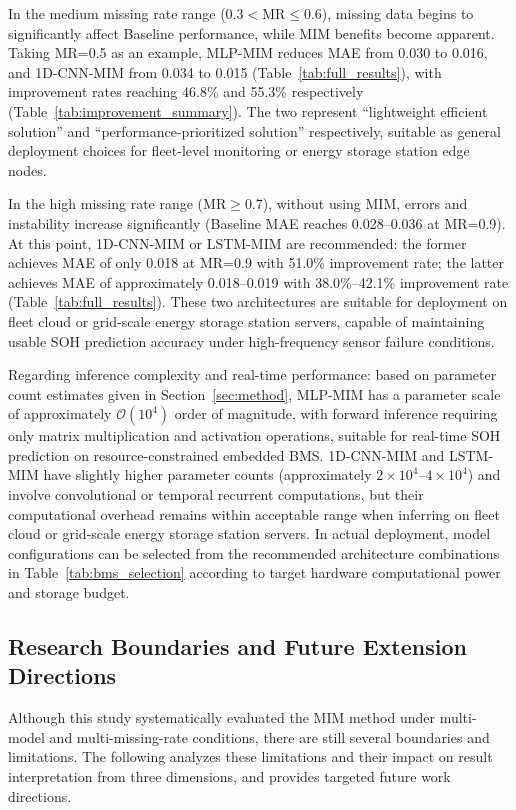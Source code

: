 \documentclass[10pt,a4paper]{article}
\begin{document}
In the medium missing rate range (0.3$<$MR$\leq$0.6), missing data begins to significantly affect Baseline performance, while MIM benefits become apparent. Taking MR=0.5 as an example, MLP-MIM reduces MAE from 0.030 to 0.016, and 1D-CNN-MIM from 0.034 to 0.015 (Table~\ref{tab:full_results}), with improvement rates reaching 46.8\% and 55.3\% respectively (Table~\ref{tab:improvement_summary}). The two represent ``lightweight efficient solution'' and ``performance-prioritized solution'' respectively, suitable as general deployment choices for fleet-level monitoring or energy storage station edge nodes.

In the high missing rate range (MR$\geq$0.7), without using MIM, errors and instability increase significantly (Baseline MAE reaches 0.028--0.036 at MR=0.9). At this point, 1D-CNN-MIM or LSTM-MIM are recommended: the former achieves MAE of only 0.018 at MR=0.9 with 51.0\% improvement rate; the latter achieves MAE of approximately 0.018--0.019 with 38.0\%--42.1\% improvement rate (Table~\ref{tab:full_results}). These two architectures are suitable for deployment on fleet cloud or grid-scale energy storage station servers, capable of maintaining usable SOH prediction accuracy under high-frequency sensor failure conditions.

Regarding inference complexity and real-time performance: based on parameter count estimates given in Section~\ref{sec:method}, MLP-MIM has a parameter scale of approximately $\mathcal{O}(10^4)$ order of magnitude, with forward inference requiring only matrix multiplication and activation operations, suitable for real-time SOH prediction on resource-constrained embedded BMS. 1D-CNN-MIM and LSTM-MIM have slightly higher parameter counts (approximately $2\times10^4$--$4\times10^4$) and involve convolutional or temporal recurrent computations, but their computational overhead remains within acceptable range when inferring on fleet cloud or grid-scale energy storage station servers. In actual deployment, model configurations can be selected from the recommended architecture combinations in Table~\ref{tab:bms_selection} according to target hardware computational power and storage budget.

\subsection{Research Boundaries and Future Extension Directions}

Although this study systematically evaluated the MIM method under multi-model and multi-missing-rate conditions, there are still several boundaries and limitations. The following analyzes these limitations and their impact on result interpretation from three dimensions, and provides targeted future work directions.
\end{document}
